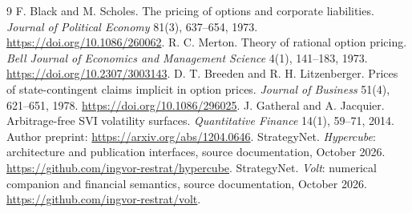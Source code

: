 \documentclass[8pt]{strategynet-journal}
\begin{document}
\clearpage
\begin{SNcolumns}
\begin{thebibliography}{9}
 F. Black and M. Scholes. The pricing of options and corporate
liabilities. \emph{Journal of Political Economy} 81(3), 637--654, 1973.
\url{https://doi.org/10.1086/260062}.
 R. C. Merton. Theory of rational option pricing.
\emph{Bell Journal of Economics and Management Science} 4(1), 141--183, 1973.
\url{https://doi.org/10.2307/3003143}.
 D. T. Breeden and R. H. Litzenberger. Prices of state-contingent
claims implicit in option prices. \emph{Journal of Business} 51(4), 621--651, 1978.
\url{https://doi.org/10.1086/296025}.
 J. Gatheral and A. Jacquier. Arbitrage-free SVI volatility surfaces.
\emph{Quantitative Finance} 14(1), 59--71, 2014. Author preprint:
\url{https://arxiv.org/abs/1204.0646}.
 StrategyNet. \emph{Hypercube}: architecture and publication
interfaces, source documentation, October 2026.
\url{https://github.com/ingvor-restrat/hypercube}.
 StrategyNet. \emph{Volt}: numerical companion and financial
semantics, source documentation, October 2026.
\url{https://github.com/ingvor-restrat/volt}.
\end{thebibliography}
\end{SNcolumns}
\end{document}
